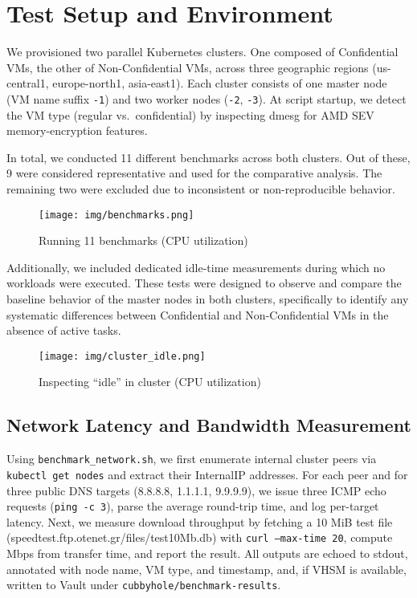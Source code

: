 \section{Test Setup and Environment}

We provisioned two parallel Kubernetes clusters. One composed of Confidential VMs, the other of Non-Confidential VMs, across three geographic regions (us-central1, europe-north1, asia-east1). Each cluster consists of one master node (VM name suffix \texttt{-1}) and two worker nodes (\texttt{-2}, \texttt{-3}). At script startup, we detect the VM type (regular vs.\ confidential) by inspecting dmesg for AMD SEV memory-encryption features.

In total, we conducted 11 different benchmarks across both clusters. Out of these, 9 were considered representative and used for the comparative analysis. The remaining two were excluded due to inconsistent or non-reproducible behavior.

\begin{figure}[H]
    \centering
    \texttt{[image: img/benchmarks.png]}
    \caption{Running 11 benchmarks (CPU utilization)}
    \label{fig:replica_cpu}
\end{figure}

Additionally, we included dedicated idle-time measurements during which no workloads were executed. These tests were designed to observe and compare the baseline behavior of the master nodes in both clusters, specifically to identify any systematic differences between Confidential and Non-Confidential VMs in the absence of active tasks.


\begin{figure}[H]
    \centering
    \texttt{[image: img/cluster\_idle.png]}
    \caption{Inspecting \enquote{idle} in cluster (CPU utilization)}
    \label{fig:replica_cpu}
\end{figure}

\subsection{Network Latency and Bandwidth Measurement}

Using \texttt{benchmark\_network.sh}, we first enumerate internal cluster peers via
\texttt{kubectl get nodes} and extract their InternalIP addresses. For each peer and for three public DNS targets (8.8.8.8, 1.1.1.1, 9.9.9.9), we issue three ICMP echo requests (\texttt{ping -c 3}), parse the average round-trip time, and log per-target latency. Next, we measure download throughput by fetching a 10 MiB test file (speedtest.ftp.otenet.gr/files/test10Mb.db) with \texttt{curl --max-time 20}, compute Mbps from transfer time, and report the result. All outputs are echoed to stdout, annotated with node name, VM type, and timestamp, and, if VHSM is available, written to Vault under \texttt{cubbyhole/benchmark-results}.

